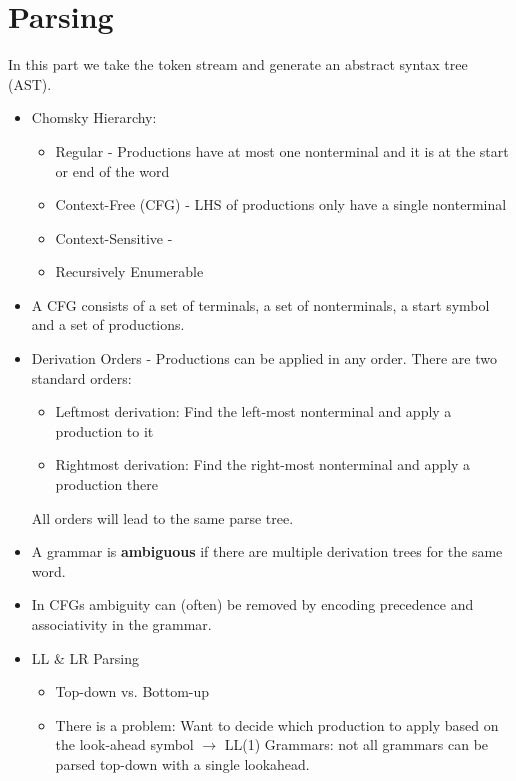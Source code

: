 \section*{Parsing}

In this part we take the token stream and generate an abstract syntax tree (AST).

\begin{itemize}
	\item Chomsky Hierarchy: 
		\begin{itemize}
			\item Regular - Productions have at most one nonterminal and it is at the start or end of the word
			\item Context-Free (CFG) - LHS of productions only have a single nonterminal
			\item Context-Sensitive - 
			\item Recursively Enumerable
		\end{itemize}
	
	\item A CFG consists of a set of terminals, a set of nonterminals, a start symbol and a set of productions.

	\item Derivation Orders - Productions can be applied in any order. There are two standard orders:
	\begin{itemize}
		\item Leftmost derivation: Find the left-most nonterminal and apply a production to it
		\item Rightmost derivation: Find the right-most nonterminal and apply a production there
	\end{itemize}
	All orders will lead to the same parse tree.
	
	\item A grammar is \textbf{ambiguous} if there are multiple derivation trees for the same word.
	
	\item In CFGs ambiguity can (often) be removed by encoding precedence and associativity in the grammar.
	
	\item LL \& LR Parsing
	\begin{itemize}
		\item Top-down vs. Bottom-up
		
		\item There is a problem: Want to decide which production to apply based on the look-ahead symbol $\rightarrow$ LL(1) Grammars: not all grammars can be parsed top-down with a single lookahead.
		

\end{itemize}
\end{itemize}
